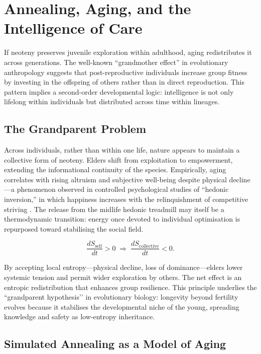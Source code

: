 \documentclass[12pt,a4paper]{article}
\begin{document}
\section{Annealing, Aging, and the Intelligence of Care}

If neoteny preserves juvenile exploration within adulthood, aging redistributes it across
generations.  The well-known ``grandmother effect'' in evolutionary anthropology
suggests that post-reproductive individuals increase group fitness by investing in the
offspring of others rather than in direct reproduction.
This pattern implies a second-order developmental logic:
intelligence is not only lifelong within individuals but distributed across time within lineages.

\subsection{The Grandparent Problem}

Across individuals, rather than within one life,
nature appears to maintain a collective form of neoteny.
Elders shift from exploitation to empowerment, extending the informational
continuity of the species.
Empirically, aging correlates with rising altruism and subjective well-being
despite physical decline---a phenomenon observed in controlled psychological studies of
``hedonic inversion,'' in which happiness increases with the relinquishment of
competitive striving \citep{carstensen2011emotional}.  
The release from the midlife hedonic treadmill may itself be a thermodynamic
transition: energy once devoted to individual optimisation is repurposed
toward stabilising the social field.

\[
\frac{dS_{\text{self}}}{dt} > 0
\;\Rightarrow\;
\frac{dS_{\text{collective}}}{dt} < 0.
\]

By accepting local entropy---physical decline, loss of dominance---elders
lower systemic tension and permit wider exploration by others.
The net effect is an entropic redistribution that enhances group resilience.
This principle underlies the ``grandparent hypothesis’’ in evolutionary biology:
longevity beyond fertility evolves because it stabilises the developmental niche 
of the young, spreading knowledge and safety as low-entropy inheritance.

\subsection{Simulated Annealing as a Model of Aging}
\end{document}
